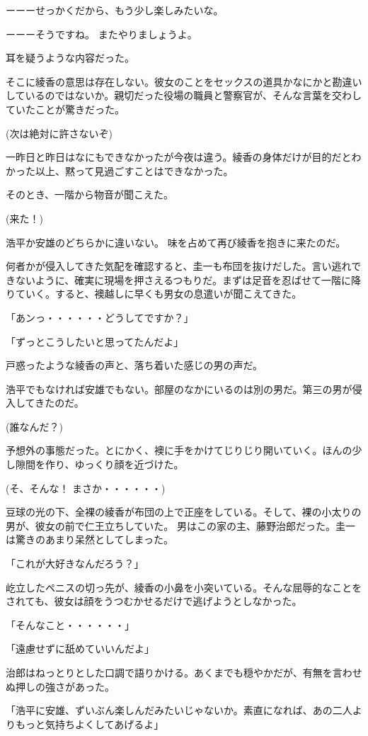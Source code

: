 ﻿\documentclass[book,tate]{jlreq}
\begin{document}
ーーーせっかくだから、もう少し楽しみたいな。

ーーーそうですね。 またやりましょうよ。

耳を疑うような内容だった。

そこに綾香の意思は存在しない。彼女のことをセックスの道具かなにかと勘違いしているのではないか。親切だった役場の職員と警察官が、そんな言葉を交わしていたことが驚きだった。

(次は絶対に許さないぞ)

一昨日と昨日はなにもできなかったが今夜は違う。綾香の身体だけが目的だとわかった以上、黙って見過ごすことはできなかった。

そのとき、一階から物音が聞こえた。

(来た！)

浩平か安雄のどちらかに違いない。 味を占めて再び綾香を抱きに来たのだ。

何者かが侵入してきた気配を確認すると、圭一も布団を抜けだした。言い逃れできないように、確実に現場を押さえるつもりだ。まずは足音を忍ばせて一階に降りていく。すると、襖越しに早くも男女の息遣いが聞こえてきた。

「あンっ・・・・・・どうしてですか？」

「ずっとこうしたいと思ってたんだよ」

戸惑ったような綾香の声と、落ち着いた感じの男の声だ。

浩平でもなければ安雄でもない。部屋のなかにいるのは別の男だ。第三の男が侵入してきたのだ。

(誰なんだ？)

予想外の事態だった。とにかく、襖に手をかけてじりじり開いていく。ほんの少し隙間を作り、ゆっくり顔を近づけた。

(そ、そんな！ まさか・・・・・・)

豆球の光の下、全裸の綾香が布団の上で正座をしている。そして、裸の小太りの男が、彼女の前で仁王立ちしていた。 男はこの家の主、藤野治郎だった。圭一は驚きのあまり呆然としてしまった。

「これが大好きなんだろう？」

屹立したペニスの切っ先が、綾香の小鼻を小突いている。そんな屈辱的なことをされても、彼女は顔をうつむかせるだけで逃げようとしなかった。

「そんなこと・・・・・・」

「遠慮せずに舐めていいんだよ」

治郎はねっとりとした口調で語りかける。あくまでも穏やかだが、有無を言わせぬ押しの強さがあった。

「浩平に安雄、ずいぶん楽しんだみたいじゃないか。素直になれば、あの二人よりもっと気持ちよくしてあげるよ」
\end{document}
